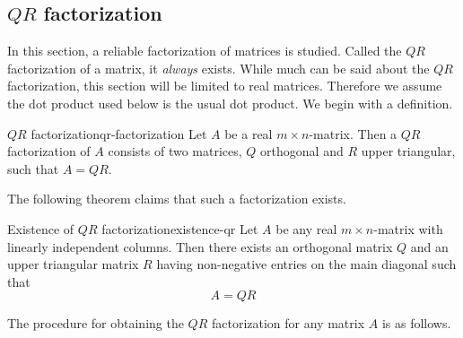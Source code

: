 \subsection{$QR$ factorization}

In this section, a reliable factorization of matrices is studied. Called the $QR$ factorization of a matrix, it \textit{always} exists. While much can be said about the $QR$ factorization, this section will be limited to real matrices. Therefore we assume the dot product used below is the usual dot product. We begin with a definition.

\begin{definition}{$QR$ factorization}{qr-factorization}
Let $A$ be a real $m\times n$-matrix. Then a $QR$ factorization of $A$ consists
of two matrices, $Q$ orthogonal and $R$ upper
triangular, such that $A=QR$.
\end{definition}

The following theorem claims that such a factorization exists.

\begin{theorem}{Existence of $QR$ factorization}{existence-qr}
Let $A$ be any real $m\times n$-matrix with linearly independent columns. Then there exists an orthogonal
matrix $Q$ and an upper triangular matrix $R$ having non-negative entries
on the main diagonal such that
\begin{equation*}
A=QR
\end{equation*}
\end{theorem}

The procedure for obtaining the $QR$ factorization for any matrix $A$ is as follows.

